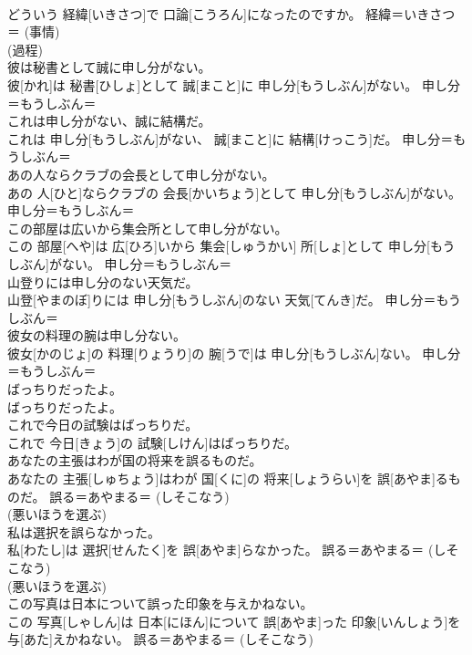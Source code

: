 \documentclass[8pt]{extreport}
\begin{document}
\begin{CJK}{UTF8}{min}
{\\	どういう 経緯[いきさつ]で 口論[こうろん]になったのですか。	経緯＝いきさつ＝ (事情) 
\\	(過程) 
\\	彼は秘書として誠に申し分がない。	
\\	彼[かれ]は 秘書[ひしょ]として 誠[まこと]に 申し分[もうしぶん]がない。	申し分＝もうしぶん＝ 
\\	これは申し分がない、誠に結構だ。	
\\	これは 申し分[もうしぶん]がない、 誠[まこと]に 結構[けっこう]だ。	申し分＝もうしぶん＝ 
\\	あの人ならクラブの会長として申し分がない。	
\\	あの 人[ひと]ならクラブの 会長[かいちょう]として 申し分[もうしぶん]がない。	申し分＝もうしぶん＝ 
\\	この部屋は広いから集会所として申し分がない。	
\\	この 部屋[へや]は 広[ひろ]いから 集会[しゅうかい] 所[しょ]として 申し分[もうしぶん]がない。	申し分＝もうしぶん＝ 
\\	山登りには申し分のない天気だ。	
\\	山登[やまのぼ]りには 申し分[もうしぶん]のない 天気[てんき]だ。	申し分＝もうしぶん＝ 
\\	彼女の料理の腕は申し分ない。	
\\	彼女[かのじょ]の 料理[りょうり]の 腕[うで]は 申し分[もうしぶん]ない。	申し分＝もうしぶん＝ 
\\	ばっちりだったよ。	
\\	ばっちりだったよ。	
\\	これで今日の試験はばっちりだ。	
\\	これで 今日[きょう]の 試験[しけん]はばっちりだ。	
\\	あなたの主張はわが国の将来を誤るものだ。	
\\	あなたの 主張[しゅちょう]はわが 国[くに]の 将来[しょうらい]を 誤[あやま]るものだ。	誤る＝あやまる＝ (しそこなう) 
\\	(悪いほうを選ぶ) 
\\	私は選択を誤らなかった。	
\\	私[わたし]は 選択[せんたく]を 誤[あやま]らなかった。	誤る＝あやまる＝ (しそこなう) 
\\	(悪いほうを選ぶ) 
\\	この写真は日本について誤った印象を与えかねない。	
\\	この 写真[しゃしん]は 日本[にほん]について 誤[あやま]った 印象[いんしょう]を 与[あた]えかねない。	誤る＝あやまる＝ (しそこなう) 
}
\end{CJK}
\end{document}
